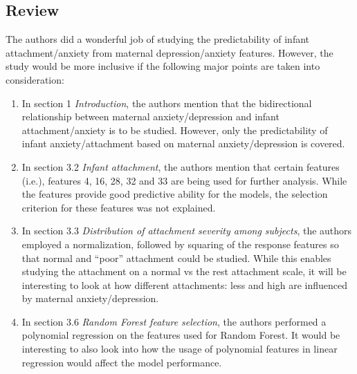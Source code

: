 \documentclass{article}
\begin{document}
\subsection*{Review}
The authors did a wonderful job of studying the predictability of infant attachment/anxiety from maternal depression/anxiety features. However, the study would be more inclusive if the following major points are taken into consideration:
\begin{enumerate}
	\itemsep0em
	\item In section 1 \textit{Introduction}, the authors mention that the bidirectional relationship between maternal anxiety/depression and infant attachment/anxiety is to be studied. However, only the predictability of infant anxiety/attachment based on maternal anxiety/depression is covered.
	\item In section 3.2 \textit{Infant attachment}, the authors mention that certain features (i.e.), features 4, 16, 28, 32 and 33 are being used for further analysis. While the features provide good predictive ability for the models, the selection criterion for these features was not explained.
	\item In section 3.3 \textit{Distribution of attachment severity among subjects}, the authors employed a normalization, followed by squaring of the response features so that normal and ``poor” attachment could be studied. While this enables studying the attachment on a normal vs the rest attachment scale, it will be interesting to look at how different attachments: less and high are influenced by maternal anxiety/depression.
	\item In section 3.6 \textit{Random Forest feature selection}, the authors performed a polynomial regression on the features used for Random Forest. It would be interesting to also look into how the usage of polynomial features in linear regression would affect the model performance.
\end{enumerate}
\end{document}
